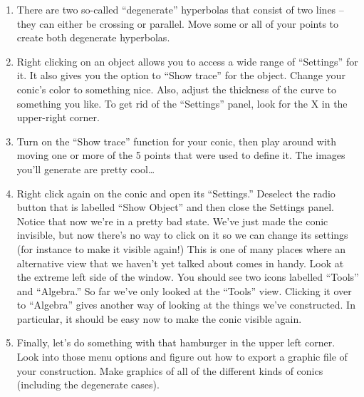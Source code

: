\begin{enumerate}
\vfill

\item There are two so-called ``degenerate'' hyperbolas that consist of two lines -- they can either be crossing or parallel.  Move some or all of your points to create both degenerate hyperbolas.

\vfill

\item Right clicking on an object allows you to access a wide range of ``Settings'' for it.  It also gives you the option to ``Show trace'' for the object.  Change your conic's color to something nice.  Also, adjust the thickness of the curve to something you like. To get rid of the ``Settings'' panel, look for the X in the upper-right corner.

\vfill

\item Turn on the ``Show trace'' function for your conic, then play around with moving one or more of the 5 points that were used to define it.  The images you'll generate are pretty cool\ldots

\vfill 

\item Right click again on the conic and open its ``Settings.''  Deselect the radio button that is labelled ``Show Object'' and then close the Settings panel.  Notice that now we're in a pretty bad state.  We've just made the conic invisible, but now there's no way to click on it so we can change its settings (for instance to make it visible again!)  This is one of many places where an alternative view that we haven't yet talked about comes in handy.  Look at the extreme left side of the window.  You should see two icons labelled ``Tools'' and ``Algebra.''  So far we've only looked at the ``Tools'' view.  Clicking it over to ``Algebra'' gives another way of looking at the things we've constructed.  In particular, it should be easy now to make the conic visible again.

\vfill

\item Finally, let's do something with that hamburger in the upper left corner.  Look into those menu options and figure out how to export a graphic file of your construction.  Make graphics of all of the different kinds of conics (including the degenerate cases).

\vfill

\end{enumerate}
